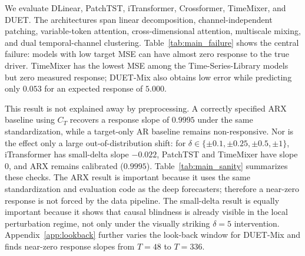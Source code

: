 \documentclass{article}
\begin{document}
We evaluate DLinear, PatchTST, iTransformer, Crossformer, TimeMixer, and DUET.
The architectures span linear decomposition, channel-independent patching,
variable-token attention, cross-dimensional attention, multiscale mixing, and
dual temporal-channel clustering. Table~\ref{tab:main_failure} shows the central
failure: models with low target MSE can have almost zero response to the true
driver. TimeMixer has the lowest MSE among the Time-Series-Library models but
zero measured response; DUET-Mix also obtains low error while predicting only
$0.053$ for an expected response of $5.000$.

\begin{table}[t]
\centering
\caption{Main causal-blindness result. The expected horizon-1 response to
$C_T\leftarrow C_T+5$ is $5.000384$. ``Pred. $|\Delta|$'' reports the absolute
mean target response; slope is computed from signed responses.}
\label{tab:main_failure}
\end{table}

This result is not explained away by preprocessing. A correctly specified ARX
baseline using $C_T$ recovers a response slope of $0.9995$ under the same
standardization, while a target-only AR baseline remains non-responsive. Nor is the
effect only a large out-of-distribution shift: for
$\delta\in\{\pm0.1,\pm0.25,\pm0.5,\pm1\}$, iTransformer has small-delta slope
$-0.022$, PatchTST and TimeMixer have slope $0$, and ARX remains calibrated
($0.9995$). Table~\ref{tab:main_sanity} summarizes these checks. The ARX result is
important because it uses the same standardization and evaluation code as the deep
forecasters; therefore a near-zero response is not forced by the data pipeline. The
small-delta result is equally important because it shows that causal blindness is
already visible in the local perturbation regime, not only under the visually
striking $\delta=5$ intervention.
Appendix~\ref{app:lookback} further varies the look-back window for DUET-Mix and
finds near-zero response slopes from $T=48$ to $T=336$.
\end{document}
